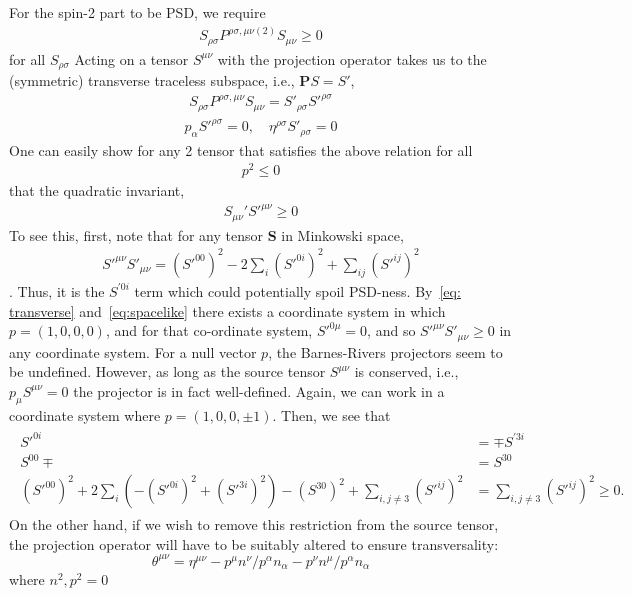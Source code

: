 \documentclass[aps,preprintnumbers,superscriptaddress,longbibliography]{revtex4-1}
\begin{document}
For the spin-2 part to be PSD, we require 
\begin{align}
 S_{\rho\sigma}P^{\rho\sigma,\mu\nu(2)}S_{\mu\nu}\geq 0    
 \label{eq: PSD}
\end{align} 
for all $ S_{\rho\sigma}$
Acting on a tensor $S^{\mu\nu}$ with the projection operator takes us to the (symmetric) transverse traceless subspace, i.e., $\textbf{P}S=S'$, 
\begin{align}
 S_{\rho\sigma}P^{\rho\sigma,\mu\nu}S_{\mu\nu}=S'_{\rho\sigma}S'^{\rho\sigma}
 \label{eq: PSD2}
\end{align}
\begin{align}
\label{eq: transverse}
    p_\alpha S'^{\rho\sigma}=0, \quad \eta^{\rho\sigma}S'_{\rho\sigma}=0
\end{align}
One can easily show for any 2 tensor that satisfies the above relation for all 
\begin{align}
\label{eq:spacelike}
    p^2\leq0
\end{align}
that the quadratic invariant, 
\begin{align}
 S_{\mu\nu}'S'^{\mu \nu} \geq 0   
\end{align}
To see this, first, note that for any tensor $\textbf{S}$ in Minkowski space,
\begin{align}
    S'^{\mu\nu}S'_{\mu\nu}=(S'^{00})^2-2\sum_i(S'^{0i})^2+\sum_{ij}(S'^{ij})^2
\end{align}. Thus, it is the $S^{'0i}$ term which could potentially spoil PSD-ness. By~\eqref{eq: transverse} and~\eqref{eq:spacelike} there exists a coordinate system in which $p=(1,0,0,0)$, and for that co-ordinate system, $S'^{0\mu}=0$, and so $S'^{\mu\nu}S'_{\mu\nu}\geq0$ in any coordinate system.
For a null vector $p$, the Barnes-Rivers projectors seem to be undefined. However, as long as the source tensor $S^{\mu\nu}$ is conserved, i.e., $p_\mu S^{\mu\nu}=0$ the projector is in fact well-defined. Again, we can work in a coordinate system where $p=(1,0,0,\pm 1)$. Then, we see that 
\begin{align}
    \begin{split}
 S'^{0i}&=\mp S^{'3i}\\S^{00}\mp &=S^{30}\\ (S'^{00})^2+2\sum_i(-(S'^{0i})^2+(S'^{3i})^2)-(S^{30})^2+\sum_{i,j\neq3}(S'^{ij})^2&= \sum_{i,j\neq3}(S'^{ij})^2\ge0   .  
    \end{split} 
    \end{align}%
On the other hand, if we wish to remove this restriction from the source tensor, the projection operator will have to be suitably altered to ensure transversality:
\begin{equation}
    \theta^{\mu \nu}=\eta^{\mu\nu}-p^{\mu}n^{\nu}/p^{\alpha}n_\alpha-p^{\nu}n^{\mu}/p^{\alpha}n_\alpha
\end{equation}
where $n^2,p^2=0$
\end{document}

